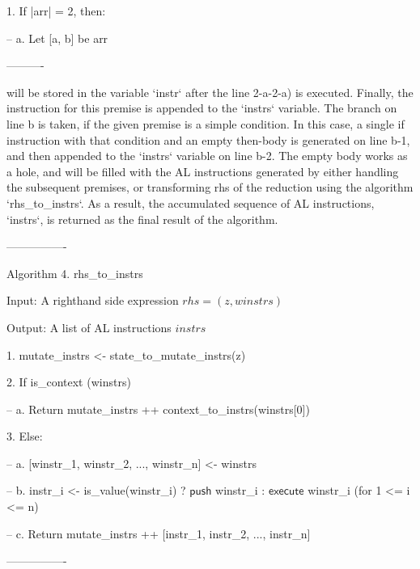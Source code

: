 1. If |arr| = 2, then:

-- a. Let [a, b] be arr

----------

will be stored in the variable `instr` after the line 2-a-2-a) is executed.
Finally, the instruction for this premise is appended to the `instrs` variable.
The branch on line b is taken, if the given premise is a simple condition.
In this case, a single if instruction with that condition and an empty then-body is generated on line
b-1, and then appended to the `instrs` variable on line b-2. The empty body works as
a hole, and will be filled with
the AL instructions generated by either handling the subsequent premises, or transforming
rhs of the reduction using the algorithm `rhs\_to\_instrs`. As a result, the accumulated
sequence of AL instructions, `instrs`, is returned as the final result of the algorithm.

----------------

Algorithm 4. rhs\_to\_instrs

Input: A righthand side expression $rhs = (z, winstrs)$

Output: A list of AL instructions $instrs$

1. mutate\_instrs <- state\_to\_mutate\_instrs(z)

2. If is\_context (winstrs)

-- a. Return mutate\_instrs ++ context\_to\_instrs(winstrs[0])

3. Else:

-- a. [winstr\_1, winstr\_2, ..., winstr\_n] <- winstrs

-- b. instr\_i <- is\_value(winstr\_i) ? $\mathsf{push}$ winstr\_i : $\mathsf{execute}$ winstr\_i  (for 1 <= i <= n)

-- c. Return mutate\_instrs ++ [instr\_1, instr\_2, ..., instr\_n]

----------------

